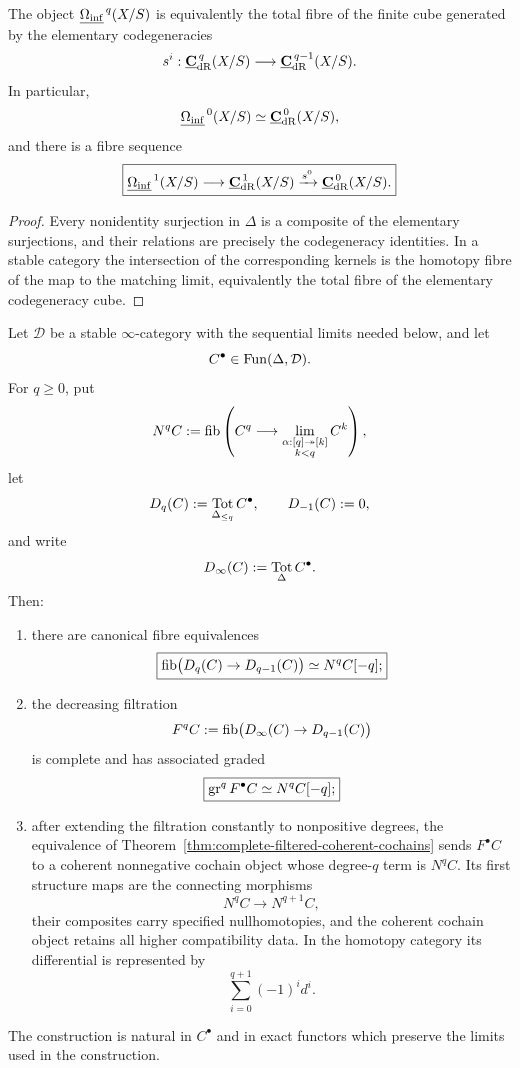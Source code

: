 \begin{proposition}
\label{prop:explicit-modal-normalized-terms}
The object \(\underline{\Omega_{\mathrm{inf}}}^{\,q}(X/S)\) is equivalently the total fibre of the finite cube
generated by the elementary codegeneracies
\[
    s^i:
    \underline{\mathbf C}_{\mathrm{dR}}^{\,q}(X/S)
    \longrightarrow
    \underline{\mathbf C}_{\mathrm{dR}}^{\,q-1}(X/S).
\]
In particular,
\[
    \underline{\Omega_{\mathrm{inf}}}^{\,0}(X/S)
    \simeq
    \underline{\mathbf C}_{\mathrm{dR}}^{\,0}(X/S),
\]
and there is a fibre sequence
\[
\boxed{
    \underline{\Omega_{\mathrm{inf}}}^{\,1}(X/S)
    \longrightarrow
    \underline{\mathbf C}_{\mathrm{dR}}^{\,1}(X/S)
    \xrightarrow{s^0}
    \underline{\mathbf C}_{\mathrm{dR}}^{\,0}(X/S).
}
\]
\end{proposition}

\begin{proof}
Every nonidentity surjection in \(\Delta\) is a composite of the elementary surjections, and their
relations are precisely the codegeneracy identities.  In a stable category the intersection of the
corresponding kernels is the homotopy fibre of the map to the matching limit, equivalently the total
fibre of the elementary codegeneracy cube.
\end{proof}

\begin{proposition}
\label{prop:monadic-de-rham-stable-dold-kan-filtration}
Let \(\mathcal D\) be a stable \(\infty\)-category with the sequential limits needed below, and let
\[
    C^\bullet\in\operatorname{Fun}(\Delta,\mathcal D).
\]
For \(q\geq0\), put
\[
    N^qC
    :=
    \operatorname{fib}
    \left(
        C^q\longrightarrow
        \operatorname*{lim}_{\substack{\alpha:[q]\twoheadrightarrow[k]\\k<q}}C^k
    \right),
\]
let
\[
    D_q(C):=\operatorname*{Tot}_{\Delta_{\leq q}}C^\bullet,
    \qquad
    D_{-1}(C):=0,
\]
and write
\[
    D_\infty(C):=\operatorname*{Tot}_\Delta C^\bullet.
\]
Then:
\begin{enumerate}
\item there are canonical fibre equivalences
\[
\boxed{
    \operatorname{fib}\bigl(D_q(C)\to D_{q-1}(C)\bigr)
    \simeq
    N^qC[-q];
}
\]
\item the decreasing filtration
\[
    F^qC
    :=
    \operatorname{fib}\bigl(D_\infty(C)\to D_{q-1}(C)\bigr)
\]
is complete and has associated graded
\[
\boxed{
    \operatorname{gr}^qF^\bullet C\simeq N^qC[-q];
}
\]
\item after extending the filtration constantly to nonpositive degrees, the equivalence of Theorem~\ref{thm:complete-filtered-coherent-cochains} sends
\(F^\bullet C\) to a coherent nonnegative cochain object whose degree-\(q\) term is \(N^qC\).
Its first structure maps are the connecting morphisms
\[
    N^qC\longrightarrow N^{q+1}C,
\]
their composites carry specified nullhomotopies, and the coherent cochain object retains all higher
compatibility data.  In the homotopy category its differential is represented by
\[
    \sum_{i=0}^{q+1}(-1)^id^i.
\]
\end{enumerate}
The construction is natural in \(C^\bullet\) and in exact functors which preserve the limits used in
the construction.
\end{proposition}

